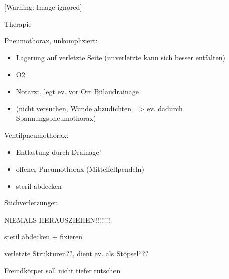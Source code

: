 \documentclass{article}
\begin{document}
\begin{center}
 [Warning: Image ignored] %

\end{center}
Therapie

Pneumothorax, unkompliziert:

\begin{itemize}
\item Lagerung auf verletzte Seite (unverletzte kann  sich besser
entfalten)

\item O2

\item Notarzt, legt ev. vor Ort B\"ulaudrainage

\item (nicht versuchen, Wunde abzudichten ={\textgreater} ev. dadurch
Spannungspneumothorax)

\end{itemize}
Ventilpneumothorax:

\begin{itemize}
\item Entlastung durch Drainage!

\item offener Pneumothorax (Mittelfellpendeln)

\item steril abdecken

\end{itemize}
Stichverletzungen

NIEMALS  HERAUSZIEHEN!!!!!!!!

steril abdecken + fixieren

verletzte Strukturen??, dient ev. als 
{\quotedblbase}St\"opsel{\textquotedblleft}??

Fremdk\"orper soll nicht tiefer rutschen
\end{document}
